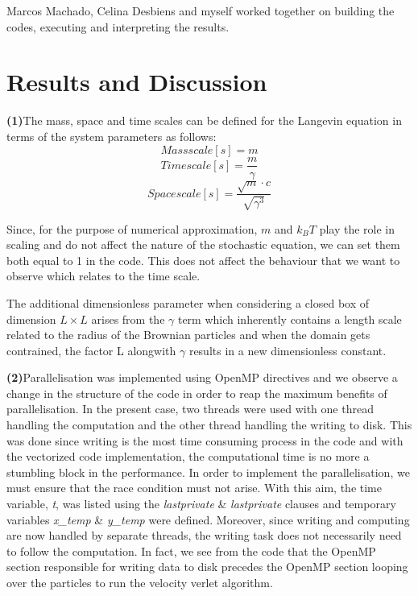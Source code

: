 \documentclass[11pt, oneside]{article}
\begin{document}
Marcos Machado, Celina Desbiens and myself worked together on building the codes, executing and interpreting the results. 
	
\section{Results and Discussion}
\textbf{(1)}\quad The mass, space and time scales can be defined for the  Langevin equation in terms of the system parameters as follows: \[Mass scale [s] = m\]  \[Time scale [s] = \frac{m}{\gamma}\]  \[Space scale [s] = \frac{\sqrt{m}\cdot c}{\sqrt{\gamma^3}}\]

Since, for the purpose of numerical approximation, \(m\) and \(k_B T\) play the role in scaling and do not affect the nature of the stochastic equation, we can set them both equal to 1 in the code. This does not affect the behaviour that we want to observe which relates to the time scale.

The additional dimensionless parameter when considering a closed box of dimension \(L \times L\) arises from the \(\gamma\) term which inherently contains a length scale related to the radius of the Brownian particles and when the domain gets contrained, the factor L alongwith \(\gamma\) results in a new dimensionless constant.


\textbf{(2)}\quad Parallelisation was implemented using OpenMP directives and we observe a change in the structure of the code in order to reap the maximum benefits of parallelisation. In the present case, two threads were used with one thread handling the computation and the other thread handling the writing to disk. This was done since writing is the most time consuming process in the code and with the vectorized code implementation, the computational time is no more a stumbling block in the performance. In order to implement the  parallelisation, we must ensure that the race condition must not arise. With this aim, the time variable, \textit{t}, was listed using the \textit{lastprivate} \& \textit{lastprivate} clauses and temporary variables \textit{x\_temp} \& \textit{y\_temp} were defined. Moreover, since writing and computing are now handled by separate threads, the writing task does not necessarily need to follow the computation. In fact, we see from the code that the OpenMP section responsible for writing data to disk precedes the OpenMP section looping over the particles to run the velocity verlet algorithm.
\end{document}
